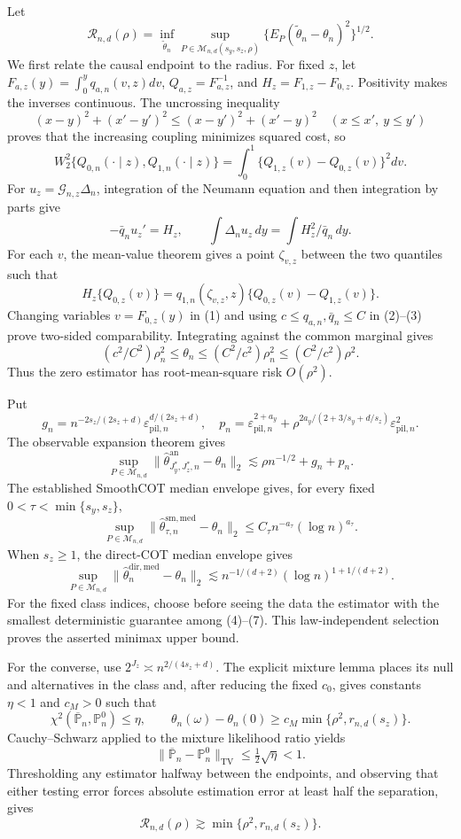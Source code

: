 Let
\[
\mathcal R_{n,d}(\rho)=\inf_{\widetilde\theta_n}
\sup_{P\in\mathcal M_{n,d}(s_y,s_z,\rho)}
\{E_P(\widetilde\theta_n-\theta_n)^2\}^{1/2}.
\]
We first relate the causal endpoint to the radius.  For fixed \(z\), let \(F_{a,z}(y)=\int_0^yq_{a,n}(v,z)dv\), \(Q_{a,z}=F_{a,z}^{-1}\), and \(H_z=F_{1,z}-F_{0,z}\).  Positivity makes the inverses continuous.  The uncrossing inequality
\[
(x-y)^2+(x'-y')^2\le(x-y')^2+(x'-y)^2
\quad(x\le x',\ y\le y')
\]
proves that the increasing coupling minimizes squared cost, so
\[
W_2^2\{Q_{0,n}(\cdot\mid z),Q_{1,n}(\cdot\mid z)\}
=\int_0^1\{Q_{1,z}(v)-Q_{0,z}(v)\}^2dv. \tag{1}
\]
For \(u_z=\mathcal G_{n,z}\Delta_n\), integration of the Neumann equation and then integration by parts give
\[
-\bar q_nu_z'=H_z,
\qquad
\int\Delta_nu_z\,dy=\int H_z^2/\bar q_n\,dy. \tag{2}
\]
For each \(v\), the mean-value theorem gives a point \(\zeta_{v,z}\) between the two quantiles such that
\[
H_z\{Q_{0,z}(v)\}=q_{1,n}(\zeta_{v,z},z)
\{Q_{0,z}(v)-Q_{1,z}(v)\}. \tag{3}
\]
Changing variables \(v=F_{0,z}(y)\) in (1) and using \(c\le q_{a,n},\bar q_n\le C\) in (2)--(3) prove two-sided comparability.  Integrating against the common marginal gives
\[
(c^2/C^2)\rho_n^2\le\theta_n\le(C^2/c^2)\rho_n^2
\le(C^2/c^2)\rho^2. \tag{4}
\]
Thus the zero estimator has root-mean-square risk \(O(\rho^2)\).

Put
\[
g_n=n^{-2s_z/(2s_z+d)}\varepsilon_{\mathrm{pil},n}^{d/(2s_z+d)},
\quad
p_n=\varepsilon_{\mathrm{pil},n}^{2+a_y}
+\rho^{2a_y/(2+3/s_y+d/s_z)}\varepsilon_{\mathrm{pil},n}^2.
\]
The observable expansion theorem gives
\[
\sup_{P\in\mathcal M_{n,d}}
\|\widehat\theta^{\mathrm{an}}_{J_y^*,J_z^*,n}-\theta_n\|_2
\lesssim\rho n^{-1/2}+g_n+p_n. \tag{5}
\]
The established SmoothCOT median envelope gives, for every fixed \(0<\tau<\min\{s_y,s_z\}\),
\[
\sup_{P\in\mathcal M_{n,d}}
\|\widehat\theta^{\mathrm{sm,med}}_{\tau,n}-\theta_n\|_2
\le C_\tau n^{-a_\tau}(\log n)^{a_\tau}. \tag{6}
\]
When \(s_z\ge1\), the direct-COT median envelope gives
\[
\sup_{P\in\mathcal M_{n,d}}
\|\widehat\theta_n^{\mathrm{dir,med}}-\theta_n\|_2
\lesssim n^{-1/(d+2)}(\log n)^{1+1/(d+2)}. \tag{7}
\]
For the fixed class indices, choose before seeing the data the estimator with the smallest deterministic guarantee among (4)--(7).  This law-independent selection proves the asserted minimax upper bound.

For the converse, use \(2^{J_z}\asymp n^{2/(4s_z+d)}\).  The explicit mixture lemma places its null and alternatives in the class and, after reducing the fixed \(c_0\), gives constants \(\eta<1\) and \(c_M>0\) such that
\[
\chi^2(\overline{\mathbb P}_n,\mathbb P_n^0)\le\eta,
\qquad
\theta_n(\omega)-\theta_n(0)
\ge c_M\min\{\rho^2,r_{n,d}(s_z)\}. \tag{8}
\]
Cauchy--Schwarz applied to the mixture likelihood ratio yields
\[
\|\overline{\mathbb P}_n-\mathbb P_n^0\|_{\mathrm{TV}}
\le\tfrac12\sqrt\eta<1. \tag{9}
\]
Thresholding any estimator halfway between the endpoints, and observing that either testing error forces absolute estimation error at least half the separation, gives
\[
\mathcal R_{n,d}(\rho)\gtrsim\min\{\rho^2,r_{n,d}(s_z)\}. \tag{10}
\]

